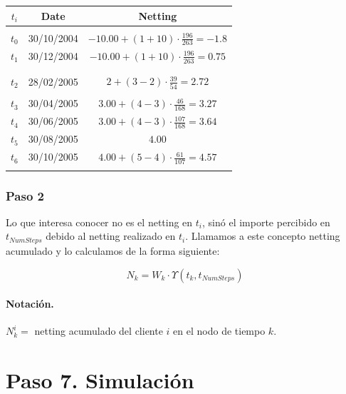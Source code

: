 \begin{minipage}[c]{0.6\columnwidth}%
\centering
\begin{tabular}{c|c|c}
\textbf{$t_i$} & \textbf{Date}  & \textbf{Netting} \\
\hline
      &            &      \\
$t_0$ & 30/10/2004 & $-10.00 + (1+10) \cdot \frac{196}{263} =  -1.8$\\
$t_1$ & 30/12/2004 & $-10.00 + (1+10) \cdot \frac{196}{263} =  0.75$ \\
      &            &      \\
      &            &      \\
$t_2$ & 28/02/2005 & $2 + (3-2) \cdot \frac{39}{54} = 2.72$ \\
      &            &      \\
$t_3$ & 30/04/2005 & $3.00 + (4-3) \cdot \frac{46}{168} = 3.27$ \\
$t_4$ & 30/06/2005 & $3.00 + (4-3) \cdot \frac{107}{168} = 3.64$ \\
$t_5$ & 30/08/2005 & $4.00$ \\
$t_6$ & 30/10/2005 & $4.00 + (5-4) \cdot \frac{61}{107} = 4.57$ \\
      &            &      \\
\end{tabular}
\end{minipage}%

\subsubsection{Paso 2}

Lo que interesa conocer no es el netting en $t_i$, sin\'o el importe
percibido en $t_{NumSteps}$ debido al netting realizado en $t_i$.
Llamamos a este concepto netting acumulado y lo calculamos de la
forma siguiente:

\begin{displaymath}
N_k =  W_k \cdot \Upsilon(t_k,t_{NumSteps})
\end{displaymath}

\paragraph{Notaci\'on.} $N_k^i =$ netting acumulado del cliente $i$ en el
nodo de tiempo $k$.


\section{Paso 7. Simulaci\'on}


